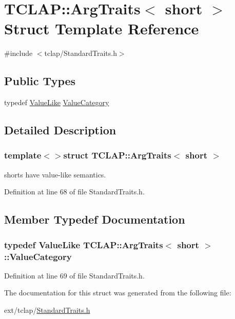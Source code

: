 \hypertarget{struct_t_c_l_a_p_1_1_arg_traits_3_01short_01_4}{}\section{T\+C\+L\+A\+P\+:\+:Arg\+Traits$<$ short $>$ Struct Template Reference}
\label{struct_t_c_l_a_p_1_1_arg_traits_3_01short_01_4}


{\ttfamily \#include $<$tclap/\+Standard\+Traits.\+h$>$}

\subsection*{Public Types}
\begin{DoxyCompactItemize}
\item 
typedef \hyperlink{struct_t_c_l_a_p_1_1_value_like}{Value\+Like} \hyperlink{struct_t_c_l_a_p_1_1_arg_traits_3_01short_01_4_a99f5d76501b120d6455b528aa7bf6896}{Value\+Category}
\end{DoxyCompactItemize}


\subsection{Detailed Description}
\subsubsection*{template$<$$>$struct T\+C\+L\+A\+P\+::\+Arg\+Traits$<$ short $>$}

shorts have value-\/like semantics. 

Definition at line 68 of file Standard\+Traits.\+h.



\subsection{Member Typedef Documentation}
\hypertarget{struct_t_c_l_a_p_1_1_arg_traits_3_01short_01_4_a99f5d76501b120d6455b528aa7bf6896}{}
\subsubsection[{Value\+Category}]{\setlength{\rightskip}{0pt plus 5cm}typedef {\bf Value\+Like} {\bf T\+C\+L\+A\+P\+::\+Arg\+Traits}$<$ short $>$\+::{\bf Value\+Category}}\label{struct_t_c_l_a_p_1_1_arg_traits_3_01short_01_4_a99f5d76501b120d6455b528aa7bf6896}


Definition at line 69 of file Standard\+Traits.\+h.



The documentation for this struct was generated from the following file\+:\begin{DoxyCompactItemize}
\item 
ext/tclap/\hyperlink{_standard_traits_8h}{Standard\+Traits.\+h}\end{DoxyCompactItemize}

